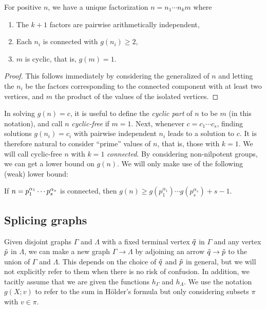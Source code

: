\begin{prop}
	For positive $n$, we have a unique factorization $n = n_1 \cdots n_k m$ where\pagebreak[3]
	\begin{enumerate} \listspace
		\item The $k + 1$ factors are pairwise arithmetically independent,
		\item Each $n_i$ is connected with $g(n_i) \ge 2$,
		\item $m$ is cyclic, that is, $g(m) = 1$.
	\end{enumerate} \textspace
\end{prop}
\begin{proof}
	This follows immediately by considering the generalized  of $n$ and letting the $n_i$ be the factors corresponding to the connected component with at least two vertices,
	and $m$ the product of the values of the isolated vertices.
\end{proof}

In solving $g(n) = c$, it is useful to define the \emph{cyclic part} of $n$ to be $m$ (in this notation), and call $n$ \emph{cyclic-free} if $m = 1$.
Next, whenever $c = c_1 \cdots c_s$, finding solutions $g(n_i) = c_i$ with pairwise independent $n_i$ leads to a solution to $c$.
It is therefore natural to consider ``prime'' values of $n$, that is, those with $k = 1$.
We will call cyclic-free $n$ with $k = 1$ \emph{connected}.
By considering non-nilpotent groups, we can get a lower bound on $g(n)$.
We will only make use of the following (weak) lower bound:

\begin{prop}
	If $n = p_1^{\alpha_1} \cdots p_s^{\alpha_s}$ is connected, then $g(n) \ge g(p_1^{\alpha_1})\cdots g(p_s^{\alpha_s}) + s - 1.$
\end{prop}

\subsection{Splicing graphs}
Given disjoint graphs $\Gamma$ and $\Lambda$ with a fixed terminal vertex $\tilde{q}$ in $\Gamma$ and any vertex $\tilde{p}$ in $\Lambda$,
we can make a new graph $\Gamma \to \Lambda$ by adjoining an arrow $\tilde{q} \to \tilde{p}$ to the union of $\Gamma$ and $\Lambda$.
This depends on the choice of $\tilde{q}$ and $\tilde{p}$ in general, but we will not explicitly refer to them when there is no risk of confusion.
In addition, we tacitly assume that we are given the functions $h_\Gamma$ and $h_\Lambda$.
We use the notation $g(X; v)$ to refer to the sum in Hölder's formula but only considering subsets $\pi$ with $v \in \pi$.

